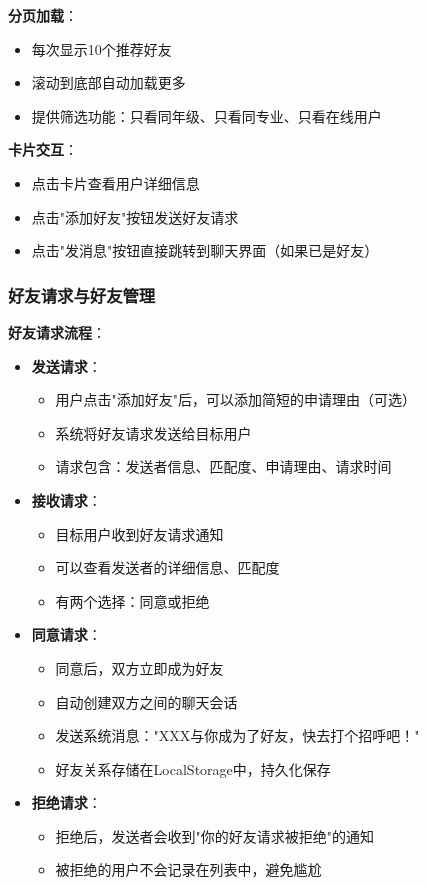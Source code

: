 \documentclass[12pt,a4paper]{article}
\begin{document}
\textbf{分页加载}：
\begin{itemize}
    \item 每次显示10个推荐好友
    \item 滚动到底部自动加载更多
    \item 提供筛选功能：只看同年级、只看同专业、只看在线用户
\end{itemize}

\textbf{卡片交互}：
\begin{itemize}
    \item 点击卡片查看用户详细信息
    \item 点击"添加好友"按钮发送好友请求
    \item 点击"发消息"按钮直接跳转到聊天界面（如果已是好友）
\end{itemize}

\subsubsection{好友请求与好友管理}

\textbf{好友请求流程}：
\begin{itemize}
    \item \textbf{发送请求}：
        \begin{itemize}
            \item 用户点击"添加好友"后，可以添加简短的申请理由（可选）
            \item 系统将好友请求发送给目标用户
            \item 请求包含：发送者信息、匹配度、申请理由、请求时间
        \end{itemize}
    
    \item \textbf{接收请求}：
        \begin{itemize}
            \item 目标用户收到好友请求通知
            \item 可以查看发送者的详细信息、匹配度
            \item 有两个选择：同意或拒绝
        \end{itemize}
    
    \item \textbf{同意请求}：
        \begin{itemize}
            \item 同意后，双方立即成为好友
            \item 自动创建双方之间的聊天会话
            \item 发送系统消息："XXX与你成为了好友，快去打个招呼吧！"
            \item 好友关系存储在LocalStorage中，持久化保存
        \end{itemize}
    
    \item \textbf{拒绝请求}：
        \begin{itemize}
            \item 拒绝后，发送者会收到"你的好友请求被拒绝"的通知
            \item 被拒绝的用户不会记录在列表中，避免尴尬
        \end{itemize}
\end{itemize}
\end{document}
